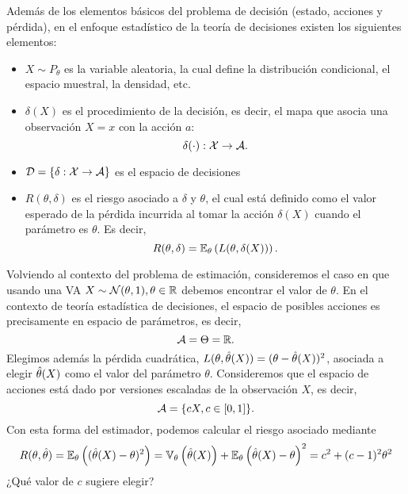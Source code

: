 Además de los elementos básicos del problema de decisión (estado, acciones y pérdida), en el enfoque estadístico de la teoría de decisiones existen los siguientes elementos:
\begin{itemize}
	\item $X\sim P_\theta$ es la variable aleatoria, la cual define la distribución condicional, el espacio muestral, la densidad, etc. 
	\item $\delta(X)$ es el procedimiento de la decisión, es decir, el mapa que asocia una observación $X=x$ con la acción $a$:
	\begin{equation}
		\delta(\cdot):{\mathcal X}\rightarrow{\mathcal A}.
	\end{equation}
	\item ${\mathcal D}=\{\delta:{\mathcal X}\rightarrow{\mathcal A}\}$ es el espacio de decisiones
	\item $R(\theta,\delta)$ es el riesgo asociado a $\delta$ y $\theta$, el cual está definido como el valor esperado de la pérdida incurrida al tomar la acción $\delta(X)$ cuando el parámetro es $\theta$. Es decir, 
	\begin{equation}
	 	R(\theta,\delta) = \mathbb{E}_\theta \left(L(\theta,\delta(X))\right).
	 \end{equation} 
\end{itemize}


\begin{example}
	Volviendo al contexto del problema de estimación, consideremos el caso en que usando una VA $X\sim{\mathcal N}(\theta,1), \theta\in{\mathbb R}$ debemos encontrar el valor de $\theta$. En el contexto de teoría estadística de decisiones, el espacio de posibles acciones es precisamente en espacio de parámetros, es decir, 
	\begin{equation}
		{\mathcal A} = \Theta = {\mathbb R}.
	\end{equation}
	Elegimos además la pérdida cuadrática, $L(\theta,{\hat\theta}(X)) = (\theta-{\hat\theta}(X))^2$, asociada a elegir ${\hat\theta}(X)$ como el valor del parámetro $\theta$. Consideremos que el espacio de acciones está dado por versiones escaladas de la observación $X$, es decir, 
	\begin{equation}
		{\mathcal A} = \{cX, c\in[0,1]\}.
	\end{equation}
	Con esta forma del estimador, podemos calcular el riesgo asociado mediante  
	\begin{equation}
		R(\theta,{\hat\theta})= \mathbb{E}_\theta \left(({\hat\theta}(X)-\theta)^2\right) = \mathbb{V}_\theta \left({\hat\theta}(X)\right) + \mathbb{E}_\theta \left({\hat\theta}(X)-\theta\right)^2 = c^2 + (c-1)^2\theta^2
	\end{equation}
	¿Qué valor de $c$ sugiere elegir?
\end{example}


